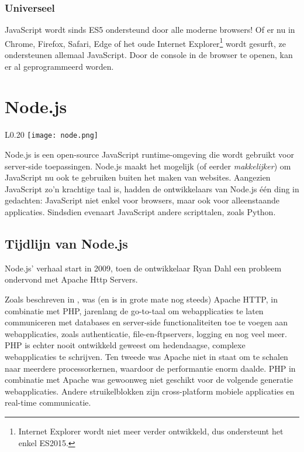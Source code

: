 \subsubsection{Universeel}
\label{sec:universal}

JavaScript wordt sinds ES5 ondersteund door alle moderne browsers! Of er nu in Chrome, Firefox, Safari, Edge of het oude Internet Explorer\footnote{Internet Explorer wordt niet meer verder ontwikkeld, dus ondersteunt het enkel ES2015.} wordt gesurft, ze ondersteunen allemaal JavaScript. Door de console in de browser te openen, kan er al geprogrammeerd worden.




\section{Node.js}
\label{sec:nodeJs}

\begin{wrapfigure}{L}{0.20\textwidth}
	\texttt{[image: node.png]}
\end{wrapfigure}Node.js is een open-source JavaScript runtime-omgeving die wordt gebruikt voor server-side toepassingen. Node.js maakt het mogelijk (of eerder \textit{makkelijker}) om JavaScript nu ook te gebruiken buiten het maken van websites. Aangezien JavaScript zo'n krachtige taal is, hadden de ontwikkelaars van Node.js één ding in gedachten: JavaScript niet enkel voor browsers, maar ook voor alleenstaande applicaties. Sindsdien evenaart JavaScript andere scripttalen, zoals Python. \textcite{Patel2018}

\subsection{Tijdlijn van Node.js}
\label{sec:nodeTimeline}
Node.js' verhaal start in 2009, toen de ontwikkelaar Ryan Dahl een probleem ondervond met Apache Http Servers. 

Zoals beschreven in \autocite{Chaniotis2015}, was (en is in grote mate nog steeds) Apache HTTP, in combinatie met PHP, jarenlang de go-to-taal om webapplicaties te laten communiceren met databases en server-side functionaliteiten toe te voegen aan \linebreak webapplicaties, zoals authenticatie, file-en-ftpservers, logging en nog veel meer. PHP is echter nooit ontwikkeld geweest om hedendaagse, complexe webapplicaties te schrijven. Ten tweede was Apache niet in staat om te schalen naar meerdere processorkernen, waardoor de performantie enorm daalde. PHP in combinatie met Apache was gewoonweg niet geschikt voor de volgende generatie webapplicaties. Andere struikelblokken zijn cross-platform mobiele applicaties en real-time communicatie.

